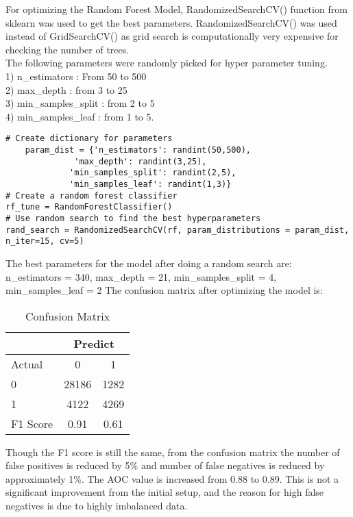 \documentclass[10pt]{article}
\begin{document}
For optimizing the Random Forest Model, RandomizedSearchCV()  function from sklearn was used to get the best parameters. RandomizedSearchCV() was used instead of GridSearchCV() as grid search is computationally very expensive for checking the number of trees.\\
The following parameters were randomly picked for hyper parameter tuning.\\
1) n\_estimators : From 50 to 500\\
2) max\_depth : from 3 to 25\\
3) min\_samples\_split : from 2 to 5\\
4) min\_samples\_leaf : from 1 to 5.
\begin{verbatim}
# Create dictionary for parameters
    param_dist = {'n_estimators': randint(50,500),
              'max_depth': randint(3,25),
             'min_samples_split': randint(2,5),
             'min_samples_leaf': randint(1,3)}
# Create a random forest classifier
rf_tune = RandomForestClassifier()
# Use random search to find the best hyperparameters
rand_search = RandomizedSearchCV(rf, param_distributions = param_dist, n_iter=15, cv=5)
\end{verbatim} 
The best parameters for the model after doing a random search are:\\
n\_estimators = 340, max\_depth = 21, min\_samples\_split = 4, min\_samples\_leaf = 2
The confusion matrix after optimizing the model is:
\begin{table}[h]
    \centering
    \begin{tabular}{|l|c|c|} \hline 
  &\multicolumn{2}{|c|}{Predict}\\ \hline 
          Actual&0&  1\\ \hline 
          0&28186&  1282\\ \hline 
          1&4122&  4269\\ \hline
 F1 Score& 0.91&0.61\\\hline
    \end{tabular}
                \caption{Confusion Matrix}
\label{Confusion Matrix - krishna2}
\end{table}
Though the F1 score is still the same, from the confusion matrix the number of  false positives is reduced by 5\% and number of false negatives is reduced by approximately 1\%. The AOC value is increased from 0.88 to 0.89. This is not a significant improvement from the initial setup, and the reason for high false negatives is due to highly imbalanced data.

\end{document}
